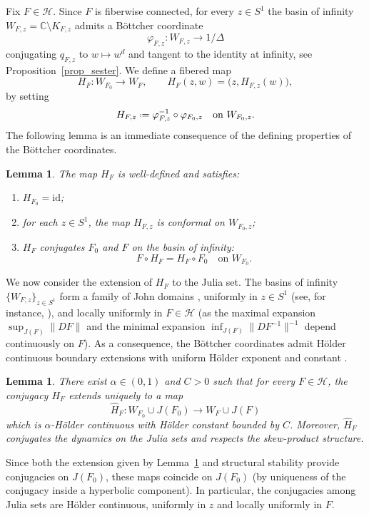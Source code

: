 \documentclass[11pt]{amsart}
\theoremstyle{plain}
\newtheorem{lem}[thm]{Lemma}
\theoremstyle{definition}
\theoremstyle{remark}
\newcommand*{\defeq}{\mathrel{\vcenter{\baselineskip0.5ex \lineskiplimit0pt
			\hbox{\scriptsize.}\hbox{\scriptsize.}}}%
	=}
\begin{document}
Fix
 $F\in\mathcal H$.
Since $F$ is fiberwise connected, for every $z\in S^1$ 
the basin of infinity
$W_{F,z}=\mathbb C\setminus K_{F,z}$ admits a B\"ottcher coordinate
\[
\varphi_{F,z}\colon W_{F,z}\longrightarrow 1/\Delta
\]
conjugating $q_{F,z}$ to $w\mapsto w^d$ and tangent to the identity at infinity,
see Proposition~\ref{prop_sester}.
We define a fibered map
\[
H_F\colon W_{F_0}\longrightarrow W_F,
\qquad
H_F(z,w) = \bigl(z, H_{F,z}(w)\bigr),
\]
by setting
\[
H_{F,z} \defeq \varphi_{F,z}^{-1}\circ \varphi_{F_0,z}
\quad \text{on } W_{F_0,z}.
\]
The  following lemma is an immediate consequence of
the defining properties of the B\"ottcher coordinates.

\begin{lem}\label{lem_interior_conjugacy}
The map $H_F$ is well-defined and satisfies:
\begin{enumerate}
\item $H_{F_0}=\mathrm{id}$;
\item for each $z\in S^1$,
 the map $H_{F,z}$ is conformal on $W_{F_0,z}$;
\item $H_F$ conjugates $F_0$ and $F$ on the basin of infinity:
\[
F\circ H_F = H_F\circ F_0 \quad \text{on } W_{F_0}.
\]
\end{enumerate}
\end{lem}

We now consider
 the extension of $H_F$ to the Julia set.
 The basins of infinity
$\{W_{F,z}\}_{z\in S^1}$ form a family of
John domains
\cite{DH,Pommerenke},
uniformly in 
$z\in S^1$ 
(see, for instance, \cite{Sumi06}),
 and locally uniformly in 
$F\in \mathcal H$
(as the maximal expansion $\sup_{J(F)}\|DF\|$ and the minimal expansion
$\inf_{J(F)}\|DF^{-1}\|^{-1}$ depend continuously on $F$).
As a consequence, the B\"ottcher coordinates admit H\"older continuous boundary extensions
with uniform H\"older exponent and constant 
\cite{CJY94}.

\begin{lem}
\label{lem_holder_conjugacy}
There exist $\alpha\in(0,1)$ and $C>0$ such that for every $F\in\mathcal H$,
the conjugacy $H_F$ extends uniquely to a map
\[
\hat H_F\colon W_{F_0}\cup J(F_0)\longrightarrow W_F \cup J(F)
\]
which is $\alpha$-H\"older continuous with H\"older constant bounded by $C$.
Moreover, $\hat H_F$ conjugates the dynamics on the Julia sets and respects the
skew-product structure.
\end{lem}



Since both the extension given by Lemma~\ref{lem_holder_conjugacy} and structural stability provide
conjugacies on $J(F_0)$, these maps coincide on $J(F_0)$ (by uniqueness of the conjugacy inside a
hyperbolic component). In particular, the conjugacies among Julia sets are H\"older continuous,
uniformly in $z$ and locally uniformly in $F$.
\end{document}
